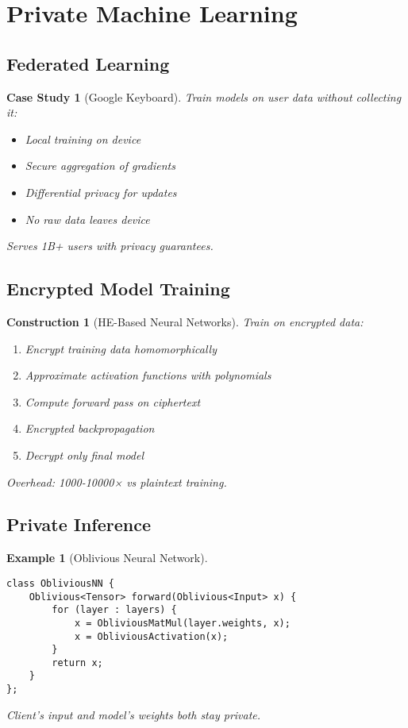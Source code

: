 \documentclass[11pt,final]{article}
\newtheorem{example}[theorem]{Example}
\newtheorem{construction}[theorem]{Construction}
\newtheorem{casestudy}[theorem]{Case Study}
\begin{document}
\section{Private Machine Learning}

\subsection{Federated Learning}

\begin{casestudy}[Google Keyboard]
Train models on user data without collecting it:
\begin{itemize}
    \item Local training on device
    \item Secure aggregation of gradients
    \item Differential privacy for updates
    \item No raw data leaves device
\end{itemize}
Serves 1B+ users with privacy guarantees.
\end{casestudy}

\subsection{Encrypted Model Training}

\begin{construction}[HE-Based Neural Networks]
Train on encrypted data:
\begin{enumerate}
    \item Encrypt training data homomorphically
    \item Approximate activation functions with polynomials
    \item Compute forward pass on ciphertext
    \item Encrypted backpropagation
    \item Decrypt only final model
\end{enumerate}
Overhead: 1000-10000× vs plaintext training.
\end{construction}

\subsection{Private Inference}

\begin{example}[Oblivious Neural Network]
\begin{verbatim}
class ObliviousNN {
    Oblivious<Tensor> forward(Oblivious<Input> x) {
        for (layer : layers) {
            x = ObliviousMatMul(layer.weights, x);
            x = ObliviousActivation(x);
        }
        return x;
    }
};
\end{verbatim}
Client's input and model's weights both stay private.
\end{example}
\end{document}

